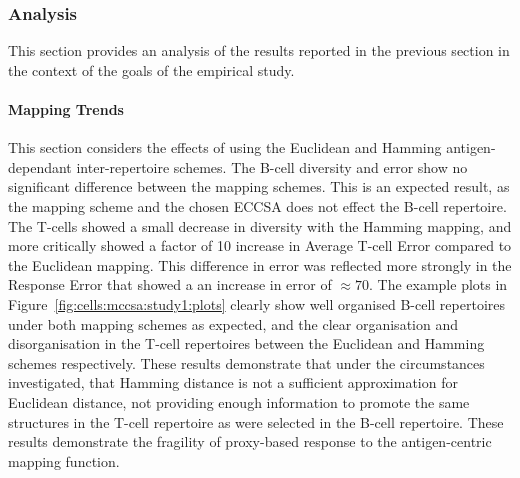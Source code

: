%
%
\subsubsection{Analysis}
This section provides an analysis of the results reported in the previous section in the context of the goals of the empirical study. 

%
%
\paragraph{Mapping Trends}
This section considers the effects of using the Euclidean and Hamming antigen-dependant inter-repertoire schemes. 
The B-cell diversity and error show no significant difference between the mapping schemes. This is an expected result, as the mapping scheme and the chosen ECCSA does not effect the B-cell repertoire.
The T-cells showed a small decrease in diversity with the Hamming mapping, and more critically showed a factor of 10 increase in Average T-cell Error compared to the Euclidean mapping. This difference in error was reflected more strongly in the Response Error that showed a an increase in error of $\approx70$. 
The example plots in Figure~\ref{fig:cells:mccsa:study1:plots} clearly show well organised B-cell repertoires under both mapping schemes as expected, and the clear organisation and disorganisation in the T-cell repertoires between the Euclidean and Hamming schemes respectively.
These results demonstrate that under the circumstances investigated, that Hamming distance is not a sufficient approximation for Euclidean distance, not providing enough information to promote the same structures in the T-cell repertoire as were selected in the B-cell repertoire. These results demonstrate the fragility of proxy-based response to the antigen-centric mapping function. 

%
%
